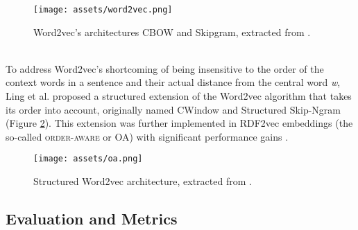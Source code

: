 \documentclass[11pt,titlepage,oneside,openany]{book}
\begin{document}
\begin{figure}[h!]
    \centering
    \centerline{\texttt{[image: assets/word2vec.png]}}
    \caption{Word2vec's architectures CBOW and Skipgram, extracted from \cite{mikolov_efficient_2013}.}
    \label{fig:word2vec}
\end{figure}
\\
To address Word2vec's shortcoming of being insensitive to the order of the context words in a sentence and their actual distance from the central word \textit{w}, Ling et al. \cite{ling_twotoo_2015} proposed a structured extension of the Word2vec algorithm that takes its order into account, originally named CWindow and Structured Skip-Ngram (Figure \ref{fig:oa}). This extension was further implemented in RDF2vec embeddings (the so-called \textsc{order-aware} or \textsc{OA}) with significant performance gains \cite{portisch_putting_2021}. \\
\begin{figure}[h!]
    \centering
    \centerline{\texttt{[image: assets/oa.png]}}
    \vspace*{-3mm}
    \caption{Structured Word2vec architecture, extracted from \cite{ling_twotoo_2015}.}
    \label{fig:oa}
\end{figure}


\subsection{Evaluation and Metrics}
\label{subsec:kge-eval}
\end{document}
